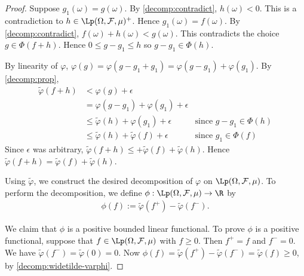 \begin{proof}
Suppose $g_1(\omega) = g(\omega)$. By \ref{decomp:contradict}, $h (\omega) < 0$. This is a contradiction to $h \in \Lp(\Omega, \mathcal{F}, \mu)^+$. Hence $g_1(\omega) = f(\omega)$. By \ref{decomp:contradict}, $f(\omega) + h(\omega) < g(\omega)$. This contradicts the choice $g \in \Phi(f + h)$. Hence $0 \leq g - g_1 \leq h$ so $g - g_1 \in \Phi(h)$.

By linearity of $\varphi$, $\varphi(g) = \varphi(g - g_1 + g_1) = \varphi(g - g_1) + \varphi(g_1)$.
By \ref{decomp:prop}, 
\begin{align*}
    \widetilde{\varphi} (f + h) &< \varphi(g) + \epsilon & \\
                                &= \varphi(g - g_1) + \varphi(g_1) + \epsilon & \\
                                &\leq \widetilde{\varphi} (h) + \varphi(g_1) + \epsilon & \text{since $g - g_1 \in \Phi(h)$} \\
                                &\leq \widetilde{\varphi}(h) + \widetilde{\varphi} (f) + \epsilon  & \text{since $g_1 \in \Phi(f)$}
\end{align*}
Since $\epsilon$ was arbitrary, $\widetilde{\varphi} (f + h) \leq + \widetilde{\varphi} (f) + \widetilde{\varphi} (h)$. Hence $\widetilde{\varphi} (f + h) = \widetilde{\varphi} (f) + \widetilde{\varphi} (h)$.

Using $\widetilde{\varphi}$, we construct the desired decomposition of $\varphi$ on $\Lp(\Omega, \mathcal{F}, \mu)$. To perform the decomposition, we define $\phi : \Lp(\Omega, \mathcal{F}, \mu) \to \R$ by
\begin{align*}
    \phi (f) := \widetilde{\varphi}(f^+) - \widetilde{\varphi}(f^-).
\end{align*}

We claim that $\phi$ is a positive bounded linear functional. To prove $\phi$ is a positive functional, suppose that $f \in \Lp(\Omega, \mathcal{F}, \mu)$ with $f \geq 0$. Then $f^+ = f$ and $f^- = 0$.
We have $\widetilde{\varphi}(f^-) = \widetilde{\varphi}(0) = 0$. Now $\phi(f) = \widetilde{\varphi}(f^+) - \widetilde{\varphi}(f^-) =  \widetilde{\varphi}(f) \geq 0$, by \ref{decomp:widetilde-varphi}.


\end{proof}
